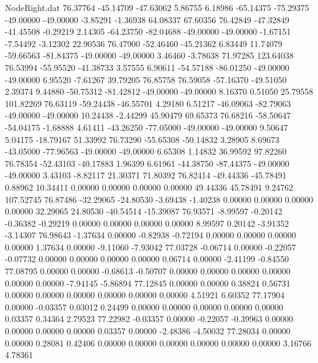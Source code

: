 \begin{filecontents}{NodeRight.dat}
  76.37764  -45.14709  -47.63062     5.86755    6.18986  -65.14375  -75.29375  -49.00000  -49.00000   -3.85291   -1.36938   64.08337   67.60356
  76.42849  -47.32849  -41.45508    -0.29219    2.14305  -64.23750  -82.04688  -49.00000  -49.00000   -1.67151   -7.54492   -3.12302   22.90536
  76.47900  -52.46460  -45.21362     6.83449   11.74079  -59.66563  -81.84375  -49.00000  -49.00000    3.46460   -3.78638   71.97285  123.64038
  76.53994  -55.95520  -41.38733     3.57555    6.90611  -54.57188  -86.01250  -49.00000  -49.00000    6.95520   -7.61267   39.79205   76.85758
  76.59058  -57.16370  -49.51050     2.39374    9.44880  -50.75312  -81.42812  -49.00000  -49.00000    8.16370    0.51050   25.79558  101.82269
  76.63119  -59.24438  -46.55701     4.29180    6.51217  -46.09063  -82.79063  -49.00000  -49.00000   10.24438   -2.44299   45.90479   69.65373
  76.68216  -58.50647  -54.04175    -1.68888    4.61411  -43.26250  -77.05000  -49.00000  -49.00000    9.50647    5.04175  -18.79167   51.33992
  76.73290  -55.65308  -50.14832     3.28905    8.69673  -43.05000  -77.96563  -49.00000  -49.00000    6.65308    1.14832   36.99592   97.82260
  76.78354  -52.43103  -40.17883     1.96399    6.61961  -44.38750  -87.44375  -49.00000  -49.00000    3.43103   -8.82117   21.30371   71.80392
  76.82414  -49.44336  -45.78491     0.88962   10.34411    0.00000    0.00000    0.00000    0.00000   49.44336   45.78491    9.24762  107.52745
  76.87486  -32.29065  -24.80530    -3.69438   -1.40238    0.00000    0.00000    0.00000    0.00000   32.29065   24.80530  -40.54514  -15.39087
  76.93571   -8.99597   -0.20142    -0.36382   -0.29219    0.00000    0.00000    0.00000    0.00000    8.99597    0.20142   -3.91352   -3.14307
  76.98643   -1.37634    0.00000    -0.82938   -0.72194    0.00000    0.00000    0.00000    0.00000    1.37634    0.00000   -9.11060   -7.93042
  77.03728   -0.06714    0.00000    -0.22057   -0.07732    0.00000    0.00000    0.00000    0.00000    0.06714    0.00000   -2.41199   -0.84550
  77.08795    0.00000    0.00000    -0.68613   -0.50707    0.00000    0.00000    0.00000    0.00000    0.00000    0.00000   -7.94145   -5.86894
  77.12845    0.00000    0.00000     0.38824    0.56731    0.00000    0.00000    0.00000    0.00000    0.00000    0.00000    4.51921    6.60352
  77.17904    0.00000   -0.03357     0.03012    0.24499    0.00000    0.00000    0.00000    0.00000    0.00000    0.03357    0.34364    2.79523
  77.22982   -0.03357    0.00000    -0.22057   -0.39963    0.00000    0.00000    0.00000    0.00000    0.03357    0.00000   -2.48386   -4.50032
  77.28034    0.00000    0.00000     0.28081    0.42406    0.00000    0.00000    0.00000    0.00000    0.00000    0.00000    3.16766    4.78361

\end{filecontents}
